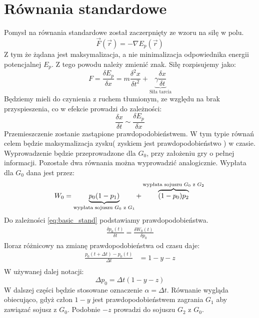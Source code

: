 \section{Równania standardowe}
\label{sec:r_stand}
Pomysł na równania standardowe został zaczerpnięty ze wzoru na siłę w polu.
\begin{equation}\label{eq:fiz_stand}
\overrightarrow{F}(\overrightarrow{r})=-\nabla E_p (\overrightarrow{r})
\end{equation}
Z tym że żądana jest maksymalizacja, a nie minimalizacja odpowiednika energii potencjalnej $E_p$. Z tego powodu należy zmienić znak. Siłę rozpisujemy jako:
\begin{equation*}
F=\frac{\delta E_p}{\delta x} = m\frac{\delta^2x}{\delta t^2} + \underbrace{\gamma \frac{\delta x}{\delta t}}_{\text{Siła tarcia}}
\end{equation*}
Będziemy mieli do czynienia z ruchem tłumionym, ze względu na brak przyspieszenia, co w efekcie prowadzi do zależności:
\begin{equation}\label{eq:basic_stand}
\frac{\delta x}{\delta t} \sim \frac{\delta E_p}{\delta x}
\end{equation}
Przemieszczenie zostanie zastąpione prawdopodobieństwem. W tym typie równań celem będzie maksymalizacja zysku( zyskiem jest prawdopodobieństwo ) w czasie. Wyprowadzenie będzie przeprowadzone dla $G_0$, przy założeniu gry o pełnej informacji. Pozostałe dwa równania można wyprowadzić analogicznie. Wypłata dla $G_0$ dana jest przez:
\begin{equation}\label{eq:wypl_stand}
W_0 = \underbrace{p_0(1-p_1)}_{\text{wypłata sojuszu $G_0$ z $G_1$}} + \overbrace{(1-p_0)p_2}^{\text{wypłata sojuszu $G_0$ z $G_2$}} \\
\end{equation}
Do zależności \ref{eq:basic_stand} podstawiamy prawdopodobieństwa.
\begin{align*}
\frac{\delta p_0(t)}{\delta t} = \frac{\delta W_0(t)}{\delta p_0}
\end{align*}
Iloraz różnicowy na zmianę prawdopodobieństwa od czasu daje:
\begin{align}
\frac{p_0(t+\Delta t)-p_0(t)}{\Delta t} &= 1-y-z \nonumber\\
\end{align}
W używanej dalej notacji:
\begin{equation}\label{eq:dynam_stand}
\Delta p_0 = \Delta t (1-y-z)
\end{equation}
W dalszej części będzie stosowane oznaczenie $\alpha = \Delta t$. Równanie wygląda obiecująco, gdyż człon $1 - y$ jest prawdopodobieństwem zagrania $G_1$ aby zawiązać sojusz z $G_0$. Podobnie $-z$ prowadzi do sojuszu $G_2$ z $G_0$.

